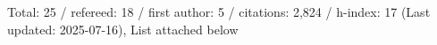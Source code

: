 Total: 25 / refereed: 18 / first author: 5 / citations: 2,824 / h-index: 17 (Last updated: 2025-07-16), List attached below